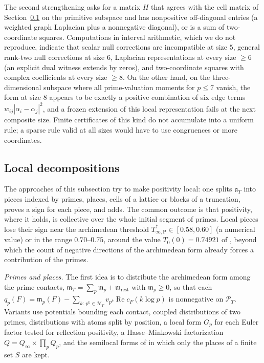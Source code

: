 \documentclass[11pt]{amsart}
\theoremstyle{definition}
\theoremstyle{remark}
\numberwithin{equation}{section}
\DeclareMathOperator{\Rel}{Re}
\newcommand{\cF}{c_F}                                  %
\newcommand{\PT}{\mathcal{P}_T}                        %
\newcommand{\NT}{\mathcal{N}_T}                        %
\newcommand{\mT}{\mathfrak{m}_T}                       %
\newcommand{\aT}{\mathfrak{a}_T}                       %
\newcommand{\Tarch}{T^{*}_{\infty,\mathrm P}}          %
\begin{document}
The second strengthening asks for a matrix $H$ that agrees with the cell matrix of Section~\ref{w4:sec:local} on the
primitive subspace and has nonpositive off-diagonal entries (a weighted graph Laplacian plus a nonnegative diagonal),
or is a sum of two-coordinate squares. Computations in interval arithmetic, which we do not reproduce, indicate that
scalar null corrections are incompatible at size $5$, general rank-two null corrections at size $6$, Laplacian
representations at every size $\ge6$ (an explicit dual witness extends by zeros), and two-coordinate squares with
complex coefficients at every size $\ge8$. On the other hand, on the three-dimensional subspace where all
prime-valuation moments for $p\le7$ vanish, the form at size $8$ appears to be exactly a positive combination of six
edge terms $w_{ij}|\alpha_i-\alpha_j|^2$, and a frozen extension of this local representation fails at the next
composite size. Finite certificates of this kind do not accumulate into a uniform rule; a sparse rule valid at all
sizes would have to use congruences or more coordinates.

\subsection{Local decompositions}\label{w4:sec:local}

The approaches of this subsection try to make positivity local: one splits $\aT$ into pieces indexed by primes, places,
cells of a lattice or blocks of a truncation, proves a sign for each piece, and adds. The common outcome is that
positivity, where it holds, is collective over the whole initial segment of primes. Local pieces lose their sign near
the archimedean threshold $\Tarch\in[0.58,0.60]$ (a numerical value) or in the range $0.70$--$0.75$, around the value
$T_0(0)=0.74921$ of \cite[Proposition~7.1]{P46}, beyond which the count of negative directions of the archimedean form
already forces a contribution of the primes.

\label{w4:fam:R3}%
\emph{Primes and places.} The first idea is to distribute the archimedean form among the prime contacts,
$\mT=\sum_{p}\mathfrak m_p+\mathfrak m_{\mathrm{rest}}$ with $\mathfrak m_p\ge0$, so that each
$q_p(F)=\mathfrak m_p(F)-\sum_{k:\,p^k\in\NT}v_{p^k}\Rel\cF(k\log p)$ is nonnegative on $\PT$. Variants use potentials
bounding each contact, coupled distributions of two primes, distributions with atoms split by position, a local form
$G_p$ for each Euler factor tested for reflection positivity, a Hasse--Minkowski factorization
$Q=Q_\infty\times\prod_pQ_p$, and the semilocal forms of \cite{P43,P45} in which only the places of a finite set $S$ are
kept.
\end{document}
